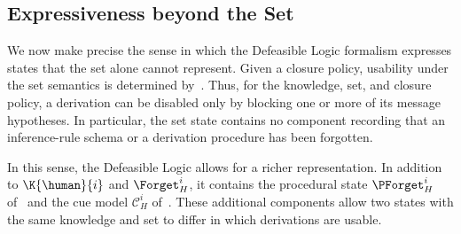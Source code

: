 \subsection{Expressiveness beyond the \Forget{} Set}
\label{Subsec:WhyDefeasible}

We now make precise the sense in which the Defeasible Logic formalism expresses states that the \Forget{} set alone cannot represent. Given a closure policy, usability under the \Forget{} set semantics is determined by~. Thus, for the knowledge, \Forget{} set, and closure policy, a derivation can be disabled only by blocking one or more of its message hypotheses. In particular, the \Forget{} set state contains no component recording that an inference-rule schema or a derivation procedure has been forgotten.

In this sense, the Defeasible Logic allows for a richer representation. In addition to \(\K{\human}{i}\) and \(\Forget_H^i\), it contains the procedural state \(\PForget_H^i\) of~ and the cue model \(\mathcal{C}_H^i\) of~. These additional components allow two states with the same knowledge and \Forget{} set to differ in which derivations are usable.

